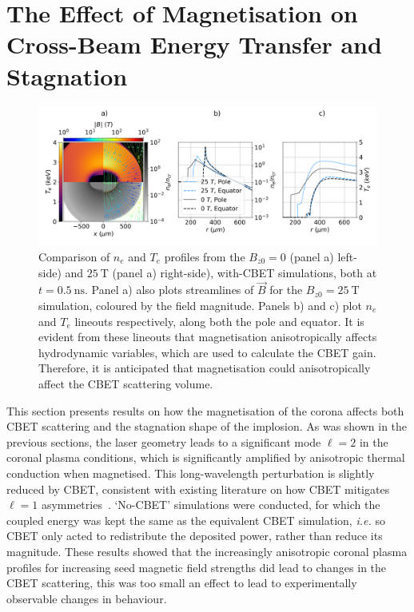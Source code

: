 \section{The Effect of Magnetisation on Cross-Beam Energy Transfer and Stagnation}%
\label{sec:Res2_mag_on_CBET}

\begin{figure}[t!]
    \includegraphics[width=\linewidth]{Results2/Images/ne_te_Bstream_comp_alt050.png}
    \centering
    \caption{Comparison of $n_e$ and $T_e$ profiles from the $B_{z0}=0$ (panel a) left-side) and $25\ \text{T}$ (panel a) right-side), with-\ac{CBET} simulations, both at $t=0.5\ \text{ns}$.
    Panel a) also plots streamlines of $\vec{B}$ for the $B_{z0}=25\ \text{T}$ simulation, coloured by the field magnitude.
    Panels b) and c) plot $n_e$ and $T_e$ lineouts respectively, along both the pole and equator.
    It is evident from these lineouts that magnetisation anisotropically affects hydrodynamic variables, which are used to calculate the \ac{CBET} gain.
    Therefore, it is anticipated that magnetisation could anisotropically affect the \ac{CBET} scattering volume.}%
    \label{fig:Res2_ne_te_Bstream_comp_alt050}
\end{figure}

This section presents results on how the magnetisation of the corona affects both \ac{CBET} scattering and the stagnation shape of the implosion.
As was shown in the previous sections, the laser geometry leads to a significant mode $\ell=2$ in the coronal plasma conditions, which is significantly amplified by anisotropic thermal conduction when magnetised.
This long-wavelength perturbation is slightly reduced by \ac{CBET}, consistent with existing literature on how \ac{CBET} mitigates $\ell=1$ asymmetries~\cite{colaitis_inverse_2021}.
`No-\ac{CBET}' simulations were conducted, for which the coupled energy was kept the same as the equivalent \ac{CBET} simulation, \textit{i.e.} so \ac{CBET} only acted to redistribute the deposited power, rather than reduce its magnitude.
These results showed that the increasingly anisotropic coronal plasma profiles for increasing seed magnetic field strengths did lead to changes in the \ac{CBET} scattering, this was too small an effect to lead to experimentally observable changes in behaviour.

